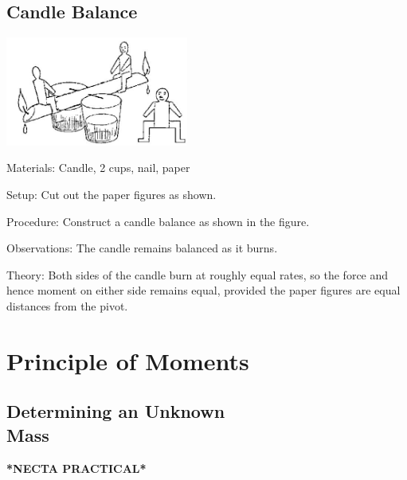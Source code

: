 \begin{multicols}{2}
\subsection{Candle Balance}

\begin{center}
\includegraphics[width=0.45\textwidth]{./img/source/candle-balance.jpg}
\end{center}

\begin{description*}
\item[Materials:]{Candle, 2 cups, nail, paper}
\item[Setup:]{Cut out the paper figures as shown.}
\item[Procedure:]{Construct a candle balance as shown in the figure.}
\item[Observations:]{The candle remains balanced as it burns.}
\item[Theory:]{Both sides of the candle burn at roughly equal rates, so the force and hence moment on either side remains equal, provided the paper figures are equal distances from the pivot. }
\end{description*}

\columnbreak


\section*{Principle of Moments}


\subsection{Determining an Unknown \hfill \\ Mass}
\textbf{*NECTA PRACTICAL*}


\end{multicols}
